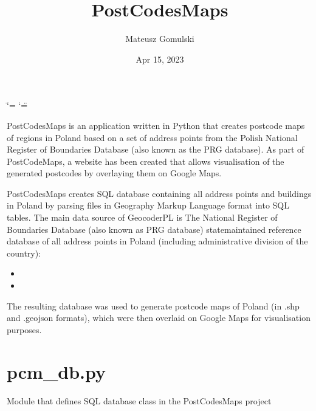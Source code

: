 \documentclass[letterpaper,10pt,english]{sphinxmanual}
\title{PostCodesMaps}
\date{Apr 15, 2023}
\author{Mateusz Gomulski}
\begin{document}
\ifdefined\shorthandoff
  \ifnum\catcode`\=\string=\active\shorthandoff{=}\fi
  \ifnum\catcode`\"=\active{}\fi
\fi

\pagestyle{empty}
\sphinxmaketitle
\pagestyle{plain}
\sphinxtableofcontents
\pagestyle{normal}
\label{\detokenize{index::doc}}


\sphinxAtStartPar
PostCodesMaps is an application written in Python that creates postcode maps of regions in Poland based on a set of address points from the Polish National Register of Boundaries Database (also known as the PRG database). As part of PostCodeMaps, a website has been created that allows visualisation of the generated postcodes by overlaying them on Google Maps.

\sphinxAtStartPar
PostCodesMaps creates SQL database containing all address points and buildings in Poland by parsing files in Geography Markup Language format into SQL tables. The main data source of GeocoderPL is The National Register of Boundaries Database (also known as PRG database) \sphinxhyphen{} state\sphinxhyphen{}maintained reference database of all address points in Poland (including administrative division of the country):
\begin{itemize}
\item {} 
\sphinxAtStartPar
{}

\item {} 
\sphinxAtStartPar
{}

\end{itemize}

\sphinxAtStartPar
The resulting database was used to generate postcode maps of Poland (in .shp and .geojson formats), which were then overlaid on Google Maps for visualisation purposes.

\sphinxstepscope


\chapter{pcm\_db.py}
\label{\detokenize{pcm_db:module-pcm_db}}\label{\detokenize{pcm_db:pcm-db-py}}\label{\detokenize{pcm_db::doc}}
\sphinxAtStartPar
Module that defines SQL database class in the PostCodesMaps project
\end{document}
